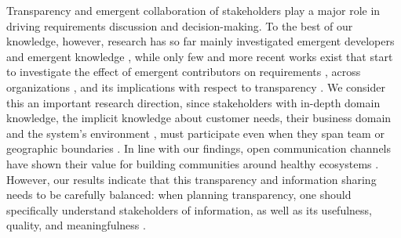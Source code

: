Transparency and emergent collaboration of stakeholders play a major role in driving requirements discussion and decision-making.
To the best of our knowledge, however, research has so far mainly investigated emergent developers~\cite{Minto2007,Haenni2014,Sadi2015} and emergent knowledge \cite{Treude2012}, while only few and more recent works exist that start to investigate the effect of emergent contributors on requirements \cite{Kwan2011}, across organizations \cite{Linaker2016,KYB+2016}, and its implications with respect to transparency \cite{Dabbish2013,Hosseini2016}. 
We consider this an important research direction, since stakeholders with in-depth domain knowledge, the implicit knowledge about customer needs, their business domain and the system’s environment \cite{Damian2013}, must participate even when they span team or geographic boundaries \cite{boden2009bridging}.
In line with our findings, open communication channels have shown their value for building communities around healthy ecosystems  \cite{Kilamo2012}. 
However, our results indicate that this transparency and information sharing needs to be carefully balanced: when planning transparency, one should specifically understand %
stakeholders of information, 
as well as its usefulness, quality, and meaningfulness \cite{Hosseini2016}.
